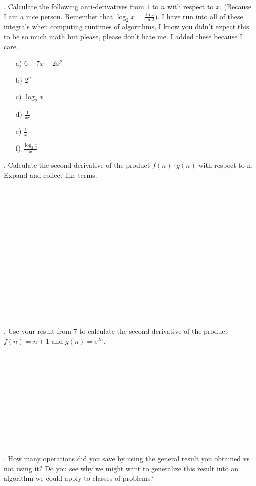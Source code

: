 \documentclass[12pt]{article}
\begin{document}
\newpage
{}. Calculate the following anti-derivatives from $1$ to $n$ with respect to $x$. (Because I am a nice person. Remember that $\log_2{x}=\frac{\ln{x}}{\ln{2}}$). I have run into all of these integrals when computing runtimes of algorithms, I know you didn't expect this to be so much math but please, please don't hate me. I added these because I care.
\begin{enumerate}
    \item[a)]$6+7x+2x^2$
    \item[b)]$2^n$
    \item[c)]$\log_{2}{x}$
    \item[d)]$\frac{1}{x^2}$
    \item[e)]$\frac{1}{x}$
    \item[f)]$\frac{\log_{2}{x}}{x}$
\end{enumerate}
\newpage
{}. Calculate the second derivative of the product $f(n) \cdot g(n)$ with respect to n. Expand and collect like terms.\\\\\\\\\\\\\\\\\\\\\\\\\\\\\\\\
. Use your result from 7 to calculate the second derivative of the product $f(n) = n + 1$ and $g(n)=e^{2n}$.\\\\\\\\\\\\\\\\\\\\\\\\
. How many operations did you save by using the general result you obtained vs not using it? Do you see why we might want to generalize this result into an algorithm we could apply to classes of problems?
\newpage
\end{document}
